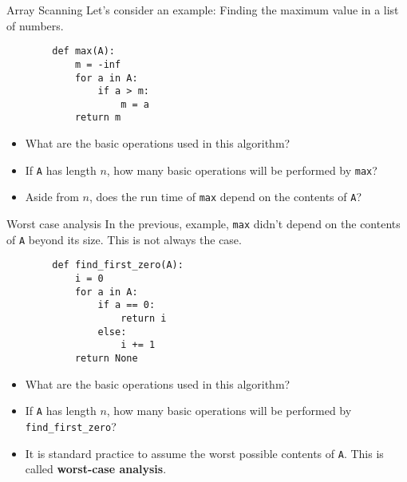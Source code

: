 \documentclass[serif,xcolor=pdftex,dvipsnames,table,hyperref={bookmarks=false,breaklinks}]{beamer}
\begin{document}
\begin{frame}[t,fragile]{Array Scanning}
	Let's consider an example: Finding the maximum value in a list of numbers.
	
	\pause
	\begin{lstlisting}
		def max(A):
		    m = -inf
		    for a in A:
		        if a > m:
		            m = a
		    return m
	\end{lstlisting}
	
	\pause
	\begin{itemize}[<+->]
		\item What are the basic operations used in this algorithm?
		\item If \verb|A| has length $n$, how many basic operations will be performed by \verb|max|?
		\item Aside from $n$, does the run time of \verb|max| depend on the contents of \verb|A|?
	\end{itemize}
\end{frame}

\begin{frame}[t,fragile]{Worst case analysis}
	In the previous, example, \verb|max| didn't depend on the contents of \verb|A| beyond its size. This is not always the case.
	
	\pause
	\begin{lstlisting}
		def find_first_zero(A):
		    i = 0
		    for a in A:
		        if a == 0:
		            return i
		        else:
		            i += 1
		    return None
	\end{lstlisting}
	
	\pause
	\begin{itemize}[<+->]
		\item What are the basic operations used in this algorithm?
		\item If \verb|A| has length $n$, how many basic operations will be performed by \verb|find_first_zero|?
		\item It is standard practice to assume the worst possible contents of \verb|A|. This is called \textbf{worst-case analysis}.
	\end{itemize}
\end{frame}
\end{document}

